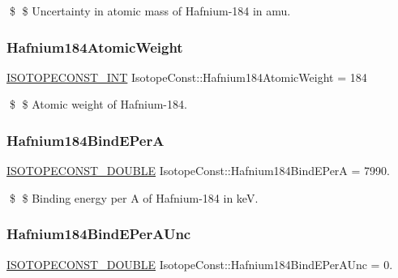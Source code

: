 \$ \$ Uncertainty in atomic mass of Hafnium-\/184 in amu. \mbox{\label{group___isotope_const-_hafnium-_hf184_gae2124f094ce0e1d714602415cac60e43}} 
\subsubsection{\texorpdfstring{Hafnium184\+Atomic\+Weight}{Hafnium184AtomicWeight}}
{\footnotesize\ttfamily \mbox{\hyperlink{group___isotope_const-_macros_ga5f18360b3e99483a35c32d789e62621c}{I\+S\+O\+T\+O\+P\+E\+C\+O\+N\+S\+T\+\_\+\+I\+NT}} Isotope\+Const\+::\+Hafnium184\+Atomic\+Weight = 184}

\$ \$ Atomic weight of Hafnium-\/184. \mbox{\label{group___isotope_const-_hafnium-_hf184_gaf1474360e931102e22ef5b73a226bf00}} 
\subsubsection{\texorpdfstring{Hafnium184\+Bind\+E\+PerA}{Hafnium184BindEPerA}}
{\footnotesize\ttfamily \mbox{\hyperlink{group___isotope_const-_macros_ga8f45a7272ce02c0b4c65c44636ed719a}{I\+S\+O\+T\+O\+P\+E\+C\+O\+N\+S\+T\+\_\+\+D\+O\+U\+B\+LE}} Isotope\+Const\+::\+Hafnium184\+Bind\+E\+PerA = 7990.}

\$ \$ Binding energy per A of Hafnium-\/184 in keV. \mbox{\label{group___isotope_const-_hafnium-_hf184_ga6e1d276a76fb529eaa539a788ba35716}} 
\subsubsection{\texorpdfstring{Hafnium184\+Bind\+E\+Per\+A\+Unc}{Hafnium184BindEPerAUnc}}
{\footnotesize\ttfamily \mbox{\hyperlink{group___isotope_const-_macros_ga8f45a7272ce02c0b4c65c44636ed719a}{I\+S\+O\+T\+O\+P\+E\+C\+O\+N\+S\+T\+\_\+\+D\+O\+U\+B\+LE}} Isotope\+Const\+::\+Hafnium184\+Bind\+E\+Per\+A\+Unc = 0.}

